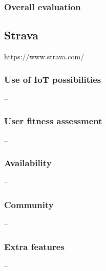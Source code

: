 \subsubsection*{Overall evaluation}

\subsection{Strava}
https://www.strava.com/
\subsubsection*{Use of IoT possibilities} --
\subsubsection*{User fitness assessment} --
\subsubsection*{Availability} --
\subsubsection*{Community} -- 
\subsubsection*{Extra features} -- 
